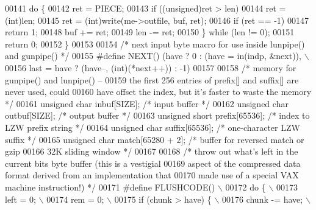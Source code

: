 \begin{DoxyCode}
00141         \textcolor{keywordflow}{do} \{
00142             ret = PIECE;
00143             \textcolor{keywordflow}{if} ((\textcolor{keywordtype}{unsigned})ret > len)
00144                 ret = (int)len;
00145             ret = (int)write(me->outfile, buf, ret);
00146             \textcolor{keywordflow}{if} (ret == -1)
00147                 \textcolor{keywordflow}{return} 1;
00148             buf += ret;
00149             len -= ret;
00150         \} \textcolor{keywordflow}{while} (len != 0);
00151     \textcolor{keywordflow}{return} 0;
00152 \}
00153 
00154 \textcolor{comment}{/* next input byte macro for use inside lunpipe() and gunpipe() */}
00155 \textcolor{preprocessor}{#define NEXT() (have ? 0 : (have = in(indp, &next)), \(\backslash\)}
00156 \textcolor{preprocessor}{                last = have ? (have--, (int)(*next++)) : -1)}
00157 
00158 \textcolor{comment}{/* memory for gunpipe() and lunpipe() --}
00159 \textcolor{comment}{   the first 256 entries of prefix[] and suffix[] are never used, could}
00160 \textcolor{comment}{   have offset the index, but it's faster to waste the memory */}
00161 \textcolor{keywordtype}{unsigned} \textcolor{keywordtype}{char} inbuf[SIZE];              \textcolor{comment}{/* input buffer */}
00162 \textcolor{keywordtype}{unsigned} \textcolor{keywordtype}{char} outbuf[SIZE];             \textcolor{comment}{/* output buffer */}
00163 \textcolor{keywordtype}{unsigned} \textcolor{keywordtype}{short} prefix[65536];           \textcolor{comment}{/* index to LZW prefix string */}
00164 \textcolor{keywordtype}{unsigned} \textcolor{keywordtype}{char} suffix[65536];            \textcolor{comment}{/* one-character LZW suffix */}
00165 \textcolor{keywordtype}{unsigned} \textcolor{keywordtype}{char} match[65280 + 2];         \textcolor{comment}{/* buffer for reversed match or gzip}
00166 \textcolor{comment}{                                           32K sliding window */}
00167 
00168 \textcolor{comment}{/* throw out what's left in the current bits byte buffer (this is a vestigial}
00169 \textcolor{comment}{   aspect of the compressed data format derived from an implementation that}
00170 \textcolor{comment}{   made use of a special VAX machine instruction!) */}
00171 \textcolor{preprocessor}{#define FLUSHCODE() \(\backslash\)}
00172 \textcolor{preprocessor}{    do \{ \(\backslash\)}
00173 \textcolor{preprocessor}{        left = 0; \(\backslash\)}
00174 \textcolor{preprocessor}{        rem = 0; \(\backslash\)}
00175 \textcolor{preprocessor}{        if (chunk > have) \{ \(\backslash\)}
00176 \textcolor{preprocessor}{            chunk -= have; \(\backslash\)}

\end{DoxyCode}
